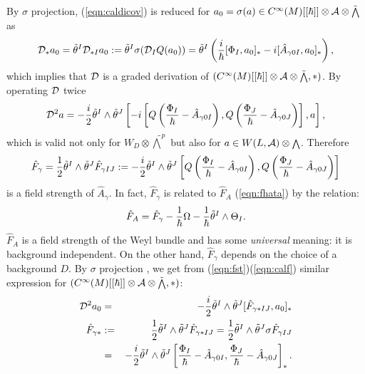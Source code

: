 \documentclass[10pt,a4paper]{article}
\def\h{\hbar}
\def\hA{{\hat A}}
\begin{document}
By $\sigma$ projection, (\ref{eqn:caldicov}) is reduced for $a_0=\sigma(a)\in C^\infty(M)[[\h]]\otimes {\cal A}\otimes {\tilde {\scriptstyle \bigwedge}}$ as
\begin{equation}
\label{eqn:hAcovst}
{\cal D}_*a_0={\tilde \theta}^I{\cal D}_{*I}a_0:={\tilde \theta}^I\sigma({\cal D}_IQ(a_0))={\tilde \theta}^I\left({i\over\h}[\Phi_I,a_0]_*-i[\hA_{\gamma0I},a_0]_*\right),
\end{equation}
which implies that ${\cal D}$ is a graded derivation of $(C^\infty(M)[[\h]]\otimes {\cal A}\otimes {\tilde {\scriptstyle \bigwedge}},*)$.
By operating ${\cal D}$ twice
\begin{equation}
\label{eqn:fst}
{\cal D}^2a=-{i\over2}{\tilde \theta}^I\wedge{\tilde \theta}^J\left[-i\left[Q\left({\Phi_I\over\h}-\hA_{\gamma0I}\right),Q\left({\Phi_J\over\h}-\hA_{\gamma0J}\right)\right],a\right],
\end{equation}
which is valid not only for $W_D\otimes {\tilde {\scriptstyle \bigwedge}}^p$ but also for $a\in W(L,{\cal A})\otimes {\scriptstyle \bigwedge}$.
Therefore
\begin{equation}
\label{eqn:calf}
{\hat F}_\gamma={1\over2}{\tilde \theta}^I\wedge{\tilde \theta}^J{\hat F}_{\gamma IJ}:= -{i\over2}{\tilde \theta}^I\wedge{\tilde \theta}^J\left[Q\left({\Phi_I\over\h}-\hA_{\gamma0I}\right),Q\left({\Phi_J\over\h}-\hA_{\gamma0J}\right)\right]
\end{equation}
is a field strength of $\hA_\gamma$.
In fact, ${\hat F}_\gamma$ is related to ${\hat F}_A$ (\ref{eqn:fhata}) by the relation:
\begin{equation}
\label{eqn:fof}
{\hat F}_A={\hat F}_\gamma-{1\over\h}\Omega-{1\over\h}{\tilde \theta}^I\wedge\Theta_I.
\end{equation}
${\hat F}_A$ is a field strength of the Weyl bundle and has some {\it universal} meaning: it is background independent. On the other hand, ${\hat F}_\gamma$ depends on the choice of a background $D$. By $\sigma$ projection , we get from (\ref{eqn:fst})(\ref{eqn:calf}) similar expression for $(C^\infty(M)[[\h]]\otimes {\cal A}\otimes {\tilde {\scriptstyle \bigwedge}},*)$:
\begin{eqnarray}
\label{eqn:Fstar}
{\cal D}^2a_0&=&-{i\over2}{\tilde \theta}^I\wedge{\tilde \theta}^J[{\hat F}_{\gamma*IJ},a_0]_*\nonumber\\
{\hat F}_{\gamma*}&:=&{1\over2}{\tilde \theta}^I\wedge{\tilde \theta}^J{\hat F}_{\gamma*IJ}={1\over2}{\tilde \theta}^I\wedge{\tilde \theta}^J\sigma{\hat F}_{\gamma IJ}\nonumber\\
&=&-{i\over2}{\tilde \theta}^I\wedge{\tilde \theta}^J\left[{\Phi_I\over\h}-\hA_{\gamma0I},{\Phi_J\over\h}-\hA_{\gamma0J}\right]_*.
\end{eqnarray}\\
\end{document}

